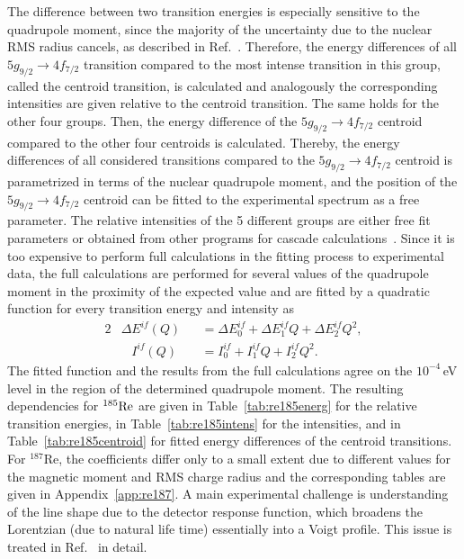 The difference between two transition energies is especially sensitive to the quadrupole moment, since the majority of the uncertainty due to the nuclear RMS radius cancels, as described in Ref.~\cite{konijn1979}. Therefore, the energy differences of all $5g_{9/2}\rightarrow4f_{7/2}$ transition compared to the most intense transition in this group, called the centroid transition, is calculated and analogously the corresponding intensities are given relative to the centroid transition.
The same holds for the other four groups. Then, the energy difference of the $5g_{9/2}\rightarrow4f_{7/2}$ centroid compared to the other four centroids is calculated.
Thereby, the energy differences of all considered transitions compared to the $5g_{9/2}\rightarrow4f_{7/2}$ centroid is parametrized in terms of the nuclear quadrupole moment, and the position of the $5g_{9/2}\rightarrow4f_{7/2}$ centroid can be fitted to the experimental spectrum as a free parameter. The relative intensities of the 5 different groups are either free fit parameters or obtained from other programs for cascade calculations~\cite{elisa_privcomm}.
Since it is too expensive to perform full calculations in the fitting process to experimental data, the full calculations are performed for several values of the quadrupole moment in the proximity of the expected value and are fitted by a quadratic function for every transition energy and intensity as
\begin{alignat}{2}
&\Delta E^{if}(Q)&&= \Delta E^{if}_0 +  \Delta E^{if}_1 Q+  \Delta E^{if}_2 Q^2,\label{eq:en_fit}\\
&\phantom{\Delta}I^{if}(Q)&&= I^{if}_0 +  I^{if}_1 Q+  I^{if}_2 Q^2.\label{eq:tran_fit}
\end{alignat}
The fitted function and the results from the full calculations agree on the $10^{-4}\,$eV level in the region of the determined quadrupole moment. The resulting dependencies for $^{185}\rm{Re}$ are given in Table~\ref{tab:re185energ} for the relative transition energies, in Table~\ref{tab:re185intens} for the intensities, and in Table~\ref{tab:re185centroid} for fitted energy differences of the centroid transitions. For $^{187}$Re, the coefficients differ only to a small extent due to different values for the magnetic moment and RMS charge radius and the corresponding tables are given in Appendix~\ref{app:re187}. 
A main experimental challenge is understanding of the line shape due to the detector response function, which broadens the Lorentzian (due to natural life time) essentially into a Voigt profile. This issue is treated in Ref.~\cite{vogiatzi2018} in detail.

